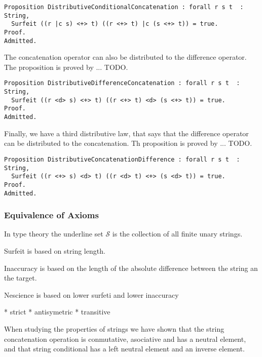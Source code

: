 \begin{sourcecode}
{\scriptsize \begin{verbatim}
Proposition DistributiveConditionalConcatenation : forall r s t  : String,
  Surfeit ((r |c s) <+> t) ((r <+> t) |c (s <+> t)) = true.
Proof.
Admitted.
\end{verbatim}}
\end{sourcecode}

The concatenation operator can also be distributed to the difference operator. The proposition is proved by ... {\color{red} TODO}.

\begin{sourcecode}
{\scriptsize \begin{verbatim}
Proposition DistributiveDifferenceConcatenation : forall r s t  : String,
  Surfeit ((r <d> s) <+> t) ((r <+> t) <d> (s <+> t)) = true.
Proof.
Admitted.
\end{verbatim}}
\end{sourcecode}

Finally, we have a third distributive law, that says that the difference operator can be distributed to the concatenation. Th proposition is proved by ... {\color{red} TODO}.

\begin{sourcecode}
{\scriptsize \begin{verbatim}
Proposition DistributiveConcatenationDifference : forall r s t  : String,
  Surfeit ((r <+> s) <d> t) ((r <d> t) <+> (s <d> t)) = true.
Proof.
Admitted.
\end{verbatim}}
\end{sourcecode}


\subsubsection*{Equivalence of Axioms}

In  type theory the underline set $\mathcal{S}$ is the collection of all finite unary strings.

Surfeit is based on string length.

Inaccuracy is based on the length of the absolute difference between the string an the target.

Nescience is based on lower surfeti and lower inaccuracy

 * strict
 * antisymetric
 * transitive

When studying the properties of strings we have shown that the string concatenation operation is conmutative, asociative and has a neutral element, and that  string conditional has a left neutral element and an inverse element.






